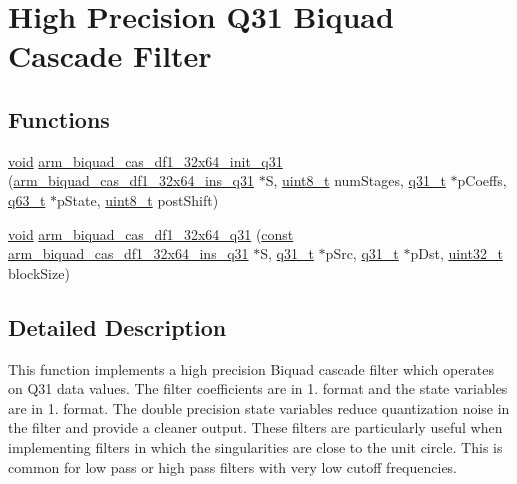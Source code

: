 \hypertarget{group___biquad_cascade_d_f1__32x64}{\section{High Precision Q31 Biquad Cascade Filter}
\label{group___biquad_cascade_d_f1__32x64}
}
\subsection*{Functions}
\begin{DoxyCompactItemize}
\item 
\hyperlink{group___n_a_m_e_ga18028b8badbf1ea7e704ccac3c488e82}{void} \hyperlink{group___biquad_cascade_d_f1__32x64_ga44900cecb8083afcaabf905ffcd656bb}{arm\-\_\-biquad\-\_\-cas\-\_\-df1\-\_\-32x64\-\_\-init\-\_\-q31} (\hyperlink{structarm__biquad__cas__df1__32x64__ins__q31}{arm\-\_\-biquad\-\_\-cas\-\_\-df1\-\_\-32x64\-\_\-ins\-\_\-q31} $\ast$S, \hyperlink{stdint_8h_aba7bc1797add20fe3efdf37ced1182c5}{uint8\-\_\-t} num\-Stages, \hyperlink{arm__math_8h_adc89a3547f5324b7b3b95adec3806bc0}{q31\-\_\-t} $\ast$p\-Coeffs, \hyperlink{arm__math_8h_a5aea1cb12fc02d9d44c8abf217eaa5c6}{q63\-\_\-t} $\ast$p\-State, \hyperlink{stdint_8h_aba7bc1797add20fe3efdf37ced1182c5}{uint8\-\_\-t} post\-Shift)
\item 
\hyperlink{group___n_a_m_e_ga18028b8badbf1ea7e704ccac3c488e82}{void} \hyperlink{group___biquad_cascade_d_f1__32x64_ga953a83e69685de6575cff37feb358a93}{arm\-\_\-biquad\-\_\-cas\-\_\-df1\-\_\-32x64\-\_\-q31} (\hyperlink{group___n_a_m_e_ga7ae6d0e43244213b34de2c2b9aa30da6}{const} \hyperlink{structarm__biquad__cas__df1__32x64__ins__q31}{arm\-\_\-biquad\-\_\-cas\-\_\-df1\-\_\-32x64\-\_\-ins\-\_\-q31} $\ast$S, \hyperlink{arm__math_8h_adc89a3547f5324b7b3b95adec3806bc0}{q31\-\_\-t} $\ast$p\-Src, \hyperlink{arm__math_8h_adc89a3547f5324b7b3b95adec3806bc0}{q31\-\_\-t} $\ast$p\-Dst, \hyperlink{stdint_8h_a435d1572bf3f880d55459d9805097f62}{uint32\-\_\-t} block\-Size)
\end{DoxyCompactItemize}


\subsection{Detailed Description}
This function implements a high precision Biquad cascade filter which operates on Q31 data values. The filter coefficients are in 1. format and the state variables are in 1. format. The double precision state variables reduce quantization noise in the filter and provide a cleaner output. These filters are particularly useful when implementing filters in which the singularities are close to the unit circle. This is common for low pass or high pass filters with very low cutoff frequencies.

